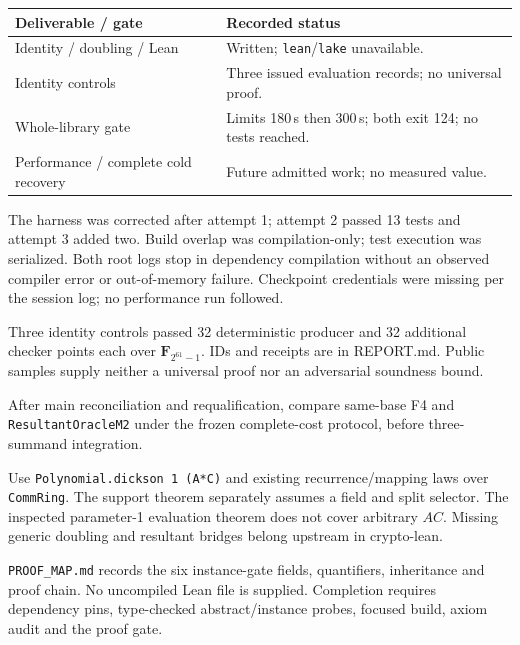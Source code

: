 \documentclass[10pt,letterpaper]{article}
\newcommand{\heading}[1]{\vspace{4pt}{\large\bfseries\color{navy}#1}\par\vspace{1pt}}
\begin{document}
\begin{tabular}{@{}p{}p{}@{}}
\toprule
\textbf{Deliverable / gate} & \textbf{Recorded status}\\
\midrule
Identity / doubling / Lean & Written; \texttt{lean}/\texttt{lake} unavailable.\\
Identity controls & Three issued evaluation records; no universal proof.\\
Whole-library gate & Limits 180\,s then 300\,s; both exit 124; no tests reached.\\
Performance / complete cold recovery & Future admitted work; no measured value.\\
\bottomrule
\end{tabular}

The harness was corrected after attempt 1; attempt 2 passed 13 tests and attempt 3 added two. Build overlap was compilation-only; test execution was serialized. Both root logs stop in dependency compilation without an observed compiler error or out-of-memory failure. Checkpoint credentials were missing per the session log; no performance run followed.

Three identity controls passed 32 deterministic producer and 32 additional checker points each over $\mathbf F_{2^{61}-1}$. IDs and receipts are in REPORT.md. Public samples supply neither a universal proof nor an adversarial soundness bound.

After main reconciliation and requalification, compare same-base F4 and \texttt{ResultantOracleM2} under the frozen complete-cost protocol, before three-summand integration.

\heading{7. Lean instance map}
Use \texttt{Polynomial.dickson 1 (A*C)} and existing recurrence/mapping laws over \texttt{CommRing}. The support theorem separately assumes a field and split selector. The inspected parameter-1 evaluation theorem does not cover arbitrary $AC$. Missing generic doubling and resultant bridges belong upstream in crypto-lean.

\texttt{PROOF\_MAP.md} records the six instance-gate fields, quantifiers, inheritance and proof chain. No uncompiled Lean file is supplied. Completion requires dependency pins, type-checked abstract/instance probes, focused build, axiom audit and the proof gate.
\end{document}
